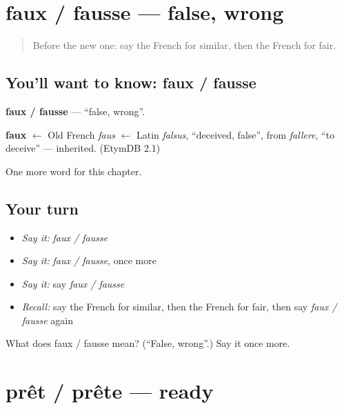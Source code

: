 \section[faux / fausse]{faux / fausse — false, wrong}

\label{lesson:FR-C245-faux-fausse}



\begin{quote}
Before the new one: say the French for similar, then the French for fair.
\end{quote}

\subsection*{You'll want to know: faux / fausse}
\textbf{faux / fausse} — \textquotedblleft{}false, wrong\textquotedblright{}.

\begin{cousinweb}
\textbf{faux} $\leftarrow$ Old French \emph{faus} $\leftarrow$ Latin \emph{falsus}, \textquotedblleft{}deceived, false\textquotedblright{}, from \emph{fallere}, \textquotedblleft{}to deceive\textquotedblright{} — inherited. (EtymDB 2.1)
\end{cousinweb}

\begin{grammarlens}[title={What you've built}]
One more word for this chapter.
\end{grammarlens}

\subsection*{Your turn}
\begin{itemize}
\raggedright
  \item \emph{Say it:} \emph{faux / fausse}
  \item \emph{Say it:} \emph{faux / fausse}, once more
  \item \emph{Say it:} say \emph{faux / fausse}
  \item \emph{Recall:} say the French for similar, then the French for fair, then say \emph{faux / fausse} again
\end{itemize}

\begin{tcolorbox}[breakable,colback=teal!4,colframe=teal!35!black,title={Before you move on}]
What does faux / fausse mean? (\textquotedblleft{}False, wrong\textquotedblright{}.) Say it once more.
\end{tcolorbox}
\section[prêt / prête]{prêt / prête — ready}

